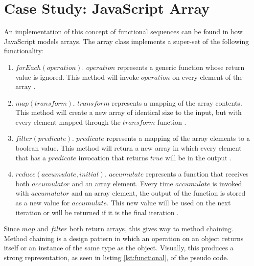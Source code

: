 \section{Case Study: JavaScript Array}

An implementation of this concept of functional sequences can be found in how JavaScript models arrays.  The array class implements a super-set of the following functionality:

\begin{enumerate}
  \item $forEach(operation)$.  $operation$ represents a generic function whose return value is ignored.  This method will invoke $operation$ on every element of the array \cite{arrayforeach16}.

  \item $map(transform)$.  $transform$ represents a mapping of the array contents.  This method will create a new array of identical size to the input, but with every element mapped through the $transform$ function \cite{arraymap16}.

  \item $filter(predicate)$.  $predicate$ represents a mapping of the array elements to a boolean value.  This method will return a new array in which every element that has a $predicate$ invocation that returns $true$ will be in the output \cite{arrayfilter16}.

  \item $reduce(accumulate, initial)$.  $accumulate$ represents a function that receives both $accumulator$ and an array element. Every time $accumulate$ is invoked with $accumulator$ and an array element, the output of the function is stored as a new value for $accumulate$.  This new value will be used on the next iteration or will be returned if it is the final iteration \cite{arrayreduce16}.

\end{enumerate}

Since $map$ and $filter$ both return arrays, this gives way to method chaining. Method chaining is a design pattern in which an operation on an object returns itself or an instance of the same type as the object. Visually, this produces a strong representation, as seen in listing \ref{lst:functional}, of the pseudo code.

\begin{minipage}{\linewidth}

\end{minipage} 

